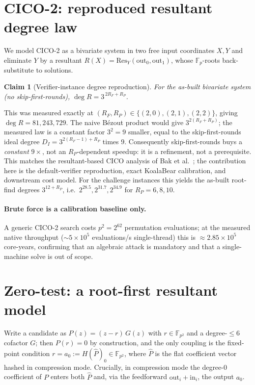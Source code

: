 \documentclass[11pt]{article}
\newcommand{\Fp}{\mathbb{F}_p}
\newcommand{\Fpp}{\mathbb{F}_{p^2}}
\newcommand{\RF}{R_F}
\newcommand{\RP}{R_P}
\newcommand{\Verified}[1]{}
\newcommand{\Verified}[1]{\marginpar{\footnotesize\textcolor{blue}{[V: #1]}}}
\theoremstyle{plain}
\newtheorem{claim}{Claim}
\begin{document}
\section{CICO-2: reproduced resultant degree law}\label{sec:cico}
We model CICO-2 as a bivariate system in two free input coordinates $X,Y$ and
eliminate $Y$ by a resultant $R(X)=\mathrm{Res}_Y(\text{out}_0,\text{out}_1)$, whose
$\Fp$-roots back-substitute to solutions.

\begin{claim}[Verifier-instance degree reproduction]\label{cl:cicodeg}
For the as-built bivariate system (no skip-first-rounds),
$\deg R = 3^{\,2\RF+\RP}$. \Verified{cico\_golden; test\_skip\_and\_gcd 5/5}
\end{claim}

This was measured exactly at $(\RF,\RP)\in\{(2,0),(2,1),(2,2)\}$, giving
$\deg R = 81,243,729$. The naive B\'ezout product would give $3^{2(\RF+\RP)}$; the
measured law is a constant factor $3^2=9$ smaller, equal to the skip-first-rounds
ideal degree $D_I=3^{2(\RF-1)+\RP}$ times $9$. Consequently skip-first-rounds buys a
\emph{constant} $9\times$, not an $\RP$-dependent speedup: it is a refinement, not a
prerequisite. This matches the resultant-based CICO analysis of
Bak et al.~\cite{cico2026}; the contribution here is the default-verifier
reproduction, exact KoalaBear calibration, and downstream cost model. For the
challenge instances this yields the as-built root-find degrees
$3^{12+\RP}$, i.e.\ $2^{28.5}, 2^{31.7}, 2^{34.9}$ for $\RP=6,8,10$.

\paragraph{Brute force is a calibration baseline only.}
A generic CICO-2 search costs $p^2 = 2^{62}$ permutation evaluations; at the measured
native throughput ($\sim 5\times 10^5$ evaluations/s single-thread) this is
$\approx 2.85\times 10^{5}$ core-years, confirming that an algebraic attack is
mandatory and that a single-machine solve is out of scope. \Verified{search;
artifacts/cico\_rp10\_relaxed\_baseline.json}

\section{Zero-test: a root-first resultant model}\label{sec:zerotest}
Write a candidate as $P(z) = (z-r)\,G(z)$ with $r\in\Fpp$ and a degree-$\le 6$
cofactor $G$; then $P(r)=0$ by construction, and the only coupling is the fixed-point
condition $r = a_0 := H(\hat P)_0 \in \Fpp$, where $\hat P$ is the flat coefficient
vector hashed in compression mode. Crucially, in compression mode the degree-$0$
coefficient of $P$ enters both $\hat P$ and, via the feedforward
$\mathrm{out}_i + \mathrm{in}_i$, the output $a_0$.
\end{document}
